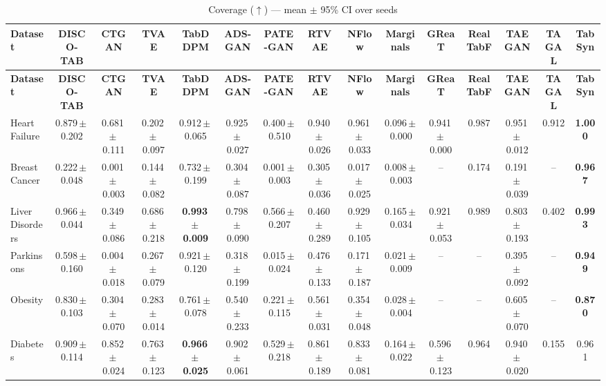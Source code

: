 \documentclass[8pt]{extarticle}
\begin{document}
\begin{longtable}{l*{14}{c}}
\caption{Coverage ($\uparrow$) --- mean $\pm$ 95\% CI over seeds}\\
\toprule
\textbf{Dataset} & \textbf{DISCO-TAB} & \textbf{CTGAN} & \textbf{TVAE} & \textbf{TabDDPM} & \textbf{ADS-GAN} & \textbf{PATE-GAN} & \textbf{RTVAE} & \textbf{NFlow} & \textbf{Marginals} & \textbf{GReaT} & \textbf{RealTabF} & \textbf{TAEGAN} & \textbf{TAGAL} & \textbf{TabSyn} \\
\midrule
\endfirsthead
\toprule
\textbf{Dataset} & \textbf{DISCO-TAB} & \textbf{CTGAN} & \textbf{TVAE} & \textbf{TabDDPM} & \textbf{ADS-GAN} & \textbf{PATE-GAN} & \textbf{RTVAE} & \textbf{NFlow} & \textbf{Marginals} & \textbf{GReaT} & \textbf{RealTabF} & \textbf{TAEGAN} & \textbf{TAGAL} & \textbf{TabSyn} \\
\midrule
\endhead
\bottomrule
\endfoot
Heart Failure & 0.879\,$\pm$\,0.202 & 0.681\,$\pm$\,0.111 & 0.202\,$\pm$\,0.097 & 0.912\,$\pm$\,0.065 & 0.925\,$\pm$\,0.027 & 0.400\,$\pm$\,0.510 & 0.940\,$\pm$\,0.026 & 0.961\,$\pm$\,0.033 & 0.096\,$\pm$\,0.000 & 0.941\,$\pm$\,0.000 & 0.987 & 0.951\,$\pm$\,0.012 & 0.912 & \textbf{1.000} \\
Breast Cancer & 0.222\,$\pm$\,0.048 & 0.001\,$\pm$\,0.003 & 0.144\,$\pm$\,0.082 & 0.732\,$\pm$\,0.199 & 0.304\,$\pm$\,0.087 & 0.001\,$\pm$\,0.003 & 0.305\,$\pm$\,0.036 & 0.017\,$\pm$\,0.025 & 0.008\,$\pm$\,0.003 & -- & 0.174 & 0.191\,$\pm$\,0.039 & -- & \textbf{0.967} \\
Liver Disorders & 0.966\,$\pm$\,0.044 & 0.349\,$\pm$\,0.086 & 0.686\,$\pm$\,0.218 & \textbf{0.993\,$\pm$\,0.009} & 0.798\,$\pm$\,0.090 & 0.566\,$\pm$\,0.207 & 0.460\,$\pm$\,0.289 & 0.929\,$\pm$\,0.105 & 0.165\,$\pm$\,0.034 & 0.921\,$\pm$\,0.053 & 0.989 & 0.803\,$\pm$\,0.193 & 0.402 & \textbf{0.993} \\
Parkinsons & 0.598\,$\pm$\,0.160 & 0.004\,$\pm$\,0.018 & 0.267\,$\pm$\,0.079 & 0.921\,$\pm$\,0.120 & 0.318\,$\pm$\,0.199 & 0.015\,$\pm$\,0.024 & 0.476\,$\pm$\,0.133 & 0.171\,$\pm$\,0.187 & 0.021\,$\pm$\,0.009 & -- & -- & 0.395\,$\pm$\,0.092 & -- & \textbf{0.949} \\
Obesity & 0.830\,$\pm$\,0.103 & 0.304\,$\pm$\,0.070 & 0.283\,$\pm$\,0.014 & 0.761\,$\pm$\,0.078 & 0.540\,$\pm$\,0.233 & 0.221\,$\pm$\,0.115 & 0.561\,$\pm$\,0.031 & 0.354\,$\pm$\,0.048 & 0.028\,$\pm$\,0.004 & -- & -- & 0.605\,$\pm$\,0.070 & -- & \textbf{0.870} \\
Diabetes & 0.909\,$\pm$\,0.114 & 0.852\,$\pm$\,0.024 & 0.763\,$\pm$\,0.123 & \textbf{0.966\,$\pm$\,0.025} & 0.902\,$\pm$\,0.061 & 0.529\,$\pm$\,0.218 & 0.861\,$\pm$\,0.189 & 0.833\,$\pm$\,0.081 & 0.164\,$\pm$\,0.022 & 0.596\,$\pm$\,0.123 & 0.964 & 0.940\,$\pm$\,0.020 & 0.155 & 0.961 \\

\end{longtable}
\end{document}

